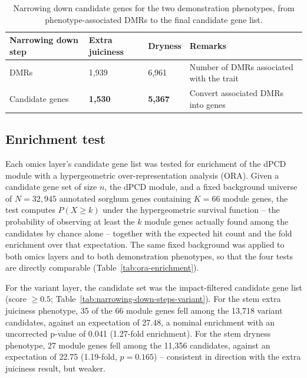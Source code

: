 \begin{table}[H]
    \centering
    \begin{tabularx}{\columnwidth}{l YY X}
        \toprule
        Narrowing down step & Extra juiciness & Dryness & Remarks \\
        \midrule
        DMRs & 1{,}939 & 6{,}961 & Number of DMRs associated with the trait \\
        Candidate genes & \textbf{1{,}530} & \textbf{5{,}367} & Convert associated DMRs into genes \\
        \bottomrule
    \end{tabularx}
    \caption{Narrowing down candidate genes for the two demonstration phenotypes, from phenotype-associated DMRs to the final candidate gene list.}
    \label{tab:narrowing-down-steps-dmr}
\end{table}

\subsection{Enrichment test}
\hspace{1em}Each omics layer's candidate gene list was tested for enrichment of the dPCD module with a hypergeometric over-representation analysis (ORA). Given a candidate gene set of size $n$, the dPCD module, and a fixed background universe of $N = 32{,}945$ annotated sorghum genes containing $K = 66$ module genes, the test computes $P(X \geq k)$ under the hypergeometric survival function -- the probability of observing at least the $k$ module genes actually found among the candidates by chance alone -- together with the expected hit count and the fold enrichment over that expectation. The same fixed background was applied to both omics layers and to both demonstration phenotypes, so that the four tests are directly comparable (Table~\ref{tab:ora-enrichment}).

\hspace{1em}For the variant layer, the candidate set was the impact-filtered candidate gene list (score $\geq 0.5$; Table~\ref{tab:narrowing-down-steps-variant}). For the stem extra juiciness phenotype, 35 of the 66 module genes fell among the 13{,}718 variant candidates, against an expectation of 27.48, a nominal enrichment with an uncorrected p-value of 0.041 (1.27-fold enrichment). For the stem dryness phenotype, 27 module genes fell among the 11{,}356 candidates, against an expectation of 22.75 (1.19-fold, $p = 0.165$) -- consistent in direction with the extra juiciness result, but weaker.

